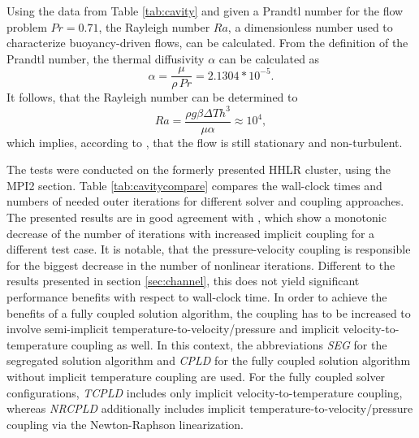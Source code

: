Using the data from Table \ref{tab:cavity} and given a Prandtl number for the flow problem \(Pr = 0.71\), the Rayleigh number \(Ra\), a dimensionless number used to characterize buoyancy-driven flows, can be calculated. From the definition of the Prandtl number, the thermal diffusivity \(\alpha\) can be calculated as
\begin{displaymath}
  \alpha = \frac{\mu}{\rho \, Pr} = 2.1304 * 10^{-5}.
\end{displaymath}
It follows, that the Rayleigh number can be determined to 
\begin{displaymath}
  Ra = \frac{\rho g \beta \Delta T h^3}{\mu \alpha} \approx 10^4,
\end{displaymath}
which implies, according to \cite{christon02}, that the flow is still stationary and non-turbulent.

The tests were conducted on the formerly presented HHLR cluster, using the MPI2 section. Table \ref{tab:cavitycompare} compares the wall-clock times and numbers of needed outer iterations for different solver and coupling approaches. The presented results are in good agreement with \cite{vakilipour12}, which show a monotonic decrease of the number of iterations with increased implicit coupling for a different test case. It is notable, that the pressure-velocity coupling is responsible for the biggest decrease in the number of nonlinear iterations. Different to the results presented in section \ref{sec:channel}, this does not yield significant performance benefits with respect to wall-clock time. In order to achieve the benefits of a fully coupled solution algorithm, the coupling has to be increased to involve semi-implicit temperature-to-velocity/pressure and implicit velocity-to-temperature coupling as well. In this context, the abbreviations \emph{SEG} for the segregated solution algorithm and \emph{CPLD} for the fully coupled solution algorithm without implicit temperature coupling are used. For the fully coupled solver configurations, \emph{TCPLD} includes only implicit velocity-to-temperature coupling, whereas \emph{NRCPLD} additionally includes implicit temperature-to-velocity/pressure coupling via the Newton-Raphson linearization.

